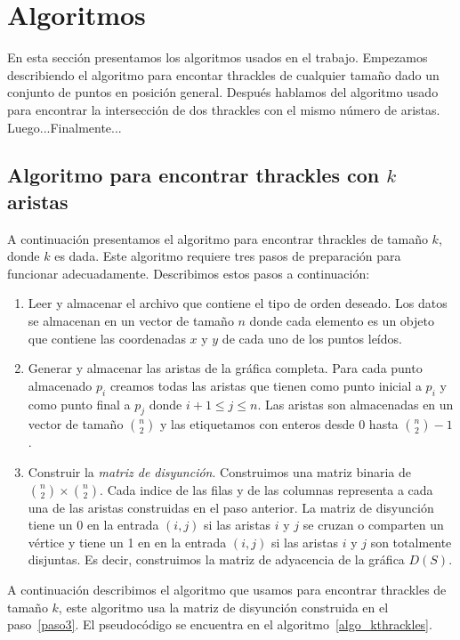 \section{Algoritmos}\label{seccion_algoritmos}
En esta sección presentamos los algoritmos usados en el trabajo. Empezamos
describiendo el algoritmo para encontar thrackles de cualquier tamaño dado
un conjunto de puntos en posición general. Después hablamos del algoritmo
usado para encontrar la intersección de dos thrackles con el mismo número de
aristas. Luego...Finalmente...


\subsection{Algoritmo para encontrar thrackles con $k$
  aristas}\label{seccion_algoritmo_kthrackles}
  A continuación presentamos el algoritmo para encontrar thrackles de tamaño
  $k$, donde $k$ es dada. Este algoritmo requiere tres pasos de preparación para funcionar adecuadamente. Describimos estos pasos a continuación:
  \begin{enumerate}
    \item Leer y almacenar el archivo que contiene el tipo de orden deseado.
    Los datos se almacenan en un vector de tamaño $n$ donde cada elemento es
    un objeto que contiene las coordenadas $x$ y $y$ de cada uno de los puntos
    leídos.
    \item Generar y almacenar las aristas de la gráfica completa.
    Para cada punto almacenado $p_i$ creamos todas las aristas que tienen como punto inicial a $p_i$ y como punto final a $p_j$ donde $ i+1 \leq j \leq n$.
    Las aristas son almacenadas en un vector de tamaño $\binom{n}{2}$ y las etiquetamos con enteros desde $0$ hasta $\binom{n}{2}-1$.
    \item \label{paso3}Construir la \emph{matriz de disyunción}.
    Construimos una matriz binaria de $\binom{n}{2}\times \binom{n}{2}$. Cada
    indice de las filas y de las columnas representa a cada una de las aristas construidas en el paso anterior. La matriz de disyunción tiene un 0 en la entrada $(i,j)$ si las aristas $i$ y $j$ se cruzan o comparten un vértice y tiene un 1 en en la entrada $(i,j)$ si las aristas $i$ y $j$ son totalmente disjuntas. Es decir, construimos la matriz de adyacencia de la gráfica $D(S)$.
  \end{enumerate}

  A continuación describimos el algoritmo que usamos para encontrar thrackles
  de tamaño $k$, este algoritmo usa la matriz de disyunción construida en el
  paso~\ref{paso3}. El pseudocódigo se encuentra en el
  algoritmo~\ref{algo_kthrackles}.

